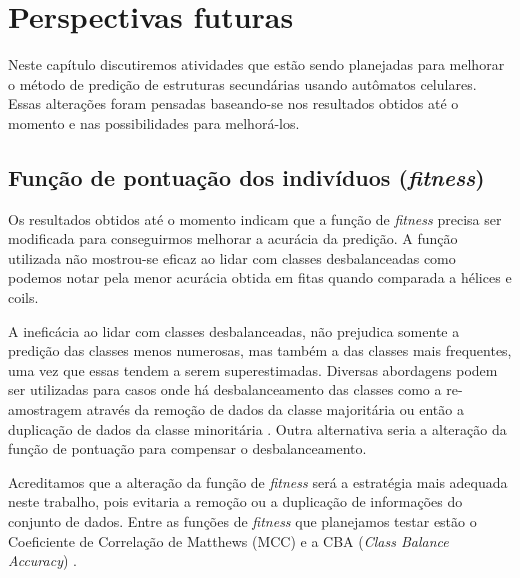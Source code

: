 \chapter{Perspectivas futuras}


Neste capítulo discutiremos atividades que estão sendo planejadas para melhorar o método de predição de estruturas secundárias usando autômatos celulares. Essas alterações foram pensadas baseando-se nos resultados obtidos até o momento e nas possibilidades para melhorá-los.

\section{Função de pontuação dos indivíduos (\textit{fitness})}


Os resultados obtidos até o momento indicam que a função de \textit{fitness} precisa ser modificada para conseguirmos melhorar a acurácia da predição. A função utilizada não mostrou-se eficaz ao lidar com classes desbalanceadas como podemos notar pela menor acurácia obtida em fitas quando comparada a hélices e coils.

A ineficácia ao lidar com classes desbalanceadas, não prejudica somente a predição das classes menos numerosas, mas também a das classes mais frequentes, uma vez que essas tendem a serem superestimadas. Diversas abordagens podem ser utilizadas para casos onde há desbalanceamento das classes como a re-amostragem através da remoção de dados da classe majoritária ou então a duplicação de dados da classe minoritária \cite{Kumar2012}. Outra alternativa seria a alteração da função de pontuação para compensar o desbalanceamento.

Acreditamos que a alteração da função de \textit{fitness} será a estratégia mais adequada neste trabalho, pois evitaria a remoção ou a duplicação de informações do conjunto de dados. Entre as funções de \textit{fitness} que planejamos testar estão o Coeficiente de Correlação de Matthews (MCC) \cite{Gorodkin2004} e a CBA (\textit{Class Balance Accuracy}) \cite{Mosley2013}.  



